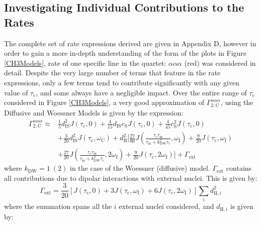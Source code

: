 \subsection{Investigating Individual Contributions to the Rates}
The complete set of rate expressions derived are given in Appendix D, however in order to gain a more in-depth understanding of the form of the plots in Figure \ref{CH3Models}, rate of one specific line in the quartet: $\alpha \alpha \alpha$ (red) was considered in detail. Despite the very large number of terms that feature in the rate expressions, only a few terms tend to contribute significantly with any given value of $\tau_{\text{c}}$, and some always have a negligible impact. Over the entire range of $\tau_{\text{c}}$ considered in Figure \ref{CH3Models}, a very good approximation of $\Gamma_{2,\text{C}}^{\alpha\alpha\alpha}$, using the Diffusive and Woessner Models is given by the expression:
\begin{equation}
\label{eq3.3}
\begin{split}
\Gamma_{2,\text{C}}^{\alpha\alpha\alpha} \approx &\frac{1}{5} d_{\text{IS}}^2 J(\tau_{\text{c}},0) + \frac{4}{15} d_{\text{IS}}c_{\text{S}} J\left(\tau_{\text{c}},0\right)+ \frac{4}{45} c_{\text{S}}^2 J\left(\tau_{\text{c}},0\right) \\ &+ \frac{3}{20} d_{\text{IS}}^2  J(\tau_{\text{c}}, \omega_{\text{C}}) +
d_{\text{II}}^2\bigg[\frac{27}{80}J\left(\frac{\tau_{\text{c}}\tau_{\text{m}}}{\tau_{\text{m}}+k_{\text{DW}}^2\tau_{\text{c}}},\omega_{\text{I}}\right)+\frac{9}{20}J\left(\tau_{\text{c}},\omega_{\text{I}}\right)\\
& +\frac{27}{20}J\left(\frac{\tau_{\text{c}}\tau_{\text{m}}}{\tau_{\text{m}}+k_{\text{DW}}^2\tau_{\text{c}}},2\omega_{\text{I}}\right)+\frac{9}{20}J\left(\tau_{\text{c}},2\omega_{\text{I}}\right)\bigg] + \Gamma_{\text{ext}}
\end{split}
\end{equation}
where $k_{\text{DW}} = 1\ (2)$ in the case of the Woessner (diffusive) model. $\Gamma_{\text{ext}}$ contains all contributions due to dipolar interactions with external nuclei. This is given by:
\begin{equation}
\label{External}
\Gamma_{\text{ext}} = \frac{3}{20}\left[J(\tau_{\text{c}},0) + 3J(\tau_{\text{c}},\omega_{\text{I}}) + 6J(\tau_{\text{c}},2 \omega_{\text{I}}) \right] \sum \limits_i d_{\text{II},i}^2
\end{equation}
where the summation spans all the $i$ external nuclei considered, and $d_{\text{II},i}$ is given by:
